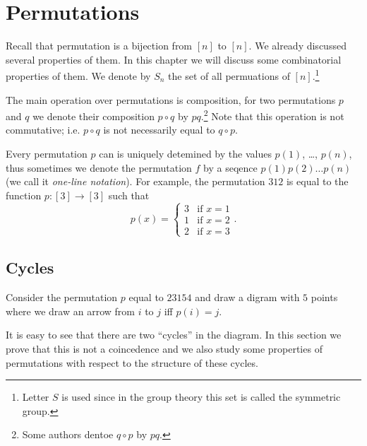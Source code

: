 \chapter{Permutations}
Recall that permutation is a bijection from $[n]$ to $[n]$. We already discussed
several properties of them. In this chapter we will discuss some combinatorial
properties of them. We denote by $S_n$ the set of all permuations of
$[n]$.\footnote{%
  Letter $S$ is used since in the group theory this set is called
  the symmetric group.
}


The main operation over permutations is composition, for two permutations $p$
and $q$ we denote their composition $p \circ q$ by $pq$.\footnote{%
  Some authors dentoe $q \circ p$ by $pq$.
}
Note that this operation is not commutative; i.e. $p \circ q$ is not
necessarily equal to $q \circ p$.

Every permutation $p$ can is uniquely detemined by the values $p(1)$, \dots,
$p(n)$, thus sometimes we denote the permutation $f$ by a seqence
$p(1) p(2) \dots p(n)$ (we call it \emph{one-line notation}).
For example, the permutation $3 1 2$ is equal to the function $p : [3] \to [3]$
such that
\[
  p(x) =
  \begin{cases}
    3 & \text{if } x = 1 \\
    1 & \text{if } x = 2 \\
    2 & \text{if } x = 3
  \end{cases}.
\]


\section{Cycles}
Consider the permutation $p$ equal to $2 3 1 5 4$ and draw a digram with
$5$ points where we draw an arrow from $i$ to $j$ iff $p(i) = j$.
\begin{center}
\end{center}
It is easy to see that there are two ``cycles'' in the diagram. In this section
we prove that this is not a coincedence and we also study some properties of
permutations with respect to the structure of these cycles.

